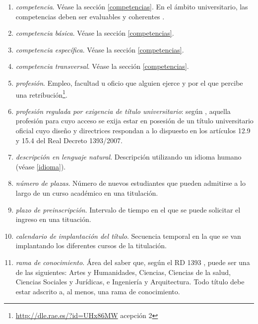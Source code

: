 \begin{enumerate}
    \item \emph{competencia}. Véase la sección \ref{competencias}.
        En el ámbito universitario, las competencias deben ser
        evaluables y coherentes \cite[página 19]{guiaAneca}.

    \item \emph{competencia básica}. Véase la sección \ref{competencias}.

    \item \emph{competencia específica}. Véase la sección \ref{competencias}.

    \item \emph{competencia transversal}. Véase la sección \ref{competencias}.

    \item \emph{profesión}. Empleo, facultad u oficio que alguien ejerce y por
        el que percibe una
        retribución\footnote{\url{http://dle.rae.es/?id=UHx86MW} acepción 2}.

    \item \emph{profesión regulada por exigencia de título universitario}:
        según \cite[artículo 4, apartado c]{rdECTS}, aquella profesión para cuyo
        acceso se exija estar en posesión de un título universitario oficial
        cuyo diseño y directrices respondan a lo dispuesto en los artículos
        12.9 y 15.4 del Real Decreto 1393/2007\cite{rd1393}.

    \item \emph{descripción en lenguaje natural}. Descripción utilizando un idioma humano (véase \ref{idioma}). 

    \item \emph{número de plazas}. Número de nuevos estudiantes que pueden
        admitirse a lo largo de un curso académico en una titulación.

    \item \emph{plazo de preinscripción}. Intervalo de tiempo en el que se
        puede solicitar el ingreso en una tituación.

    \item \emph{calendario de implantación del título}. Secuencia temporal en la
        que se van implantando los diferentes cursos de la
        titulación\cite[página 62]{guiaAneca}.

    \item \emph{rama de conocimiento}. Área del saber que, según el RD 1393
        \cite[artículo 12, apartado 4]{rd1393}, puede ser una de las siguientes:
        Artes y Humanidades, Ciencias, Ciencias de la salud, Ciencias Sociales
        y Jurídicas, e Ingeniería y Arquitectura. Todo título debe estar
        adscrito a, al menos, una rama de conocimiento.


\end{enumerate}
